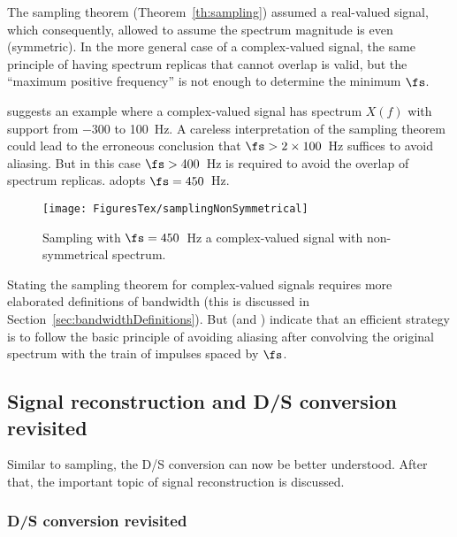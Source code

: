 The sampling theorem (Theorem~\ref{th:sampling}) assumed a real-valued signal, which consequently,
allowed to assume the spectrum magnitude is even (symmetric). In the more general case
of a complex-valued signal, the same principle of having spectrum replicas that cannot overlap
is valid, but the ``maximum positive frequency'' is not enough to determine the minimum $\fs$.

 suggests an example where a complex-valued signal has spectrum
$X(f)$ with support from $-300$ to 100~Hz. A careless interpretation of the sampling theorem
could lead to the erroneous conclusion that $\fs > 2 \times 100$~Hz suffices to avoid aliasing.
But in this case $\fs > 400$~Hz is required to avoid the overlap of spectrum replicas.
 adopts $\fs = 450$~Hz.

\begin{figure}
\centering
\texttt{[image: FiguresTex/samplingNonSymmetrical]}
\caption{Sampling with $\fs=450$~Hz a complex-valued signal with non-symmetrical spectrum.\label{fig:samplingNonSymmetrical}}
\end{figure}

Stating the sampling theorem for complex-valued signals requires more elaborated definitions of bandwidth (this is discussed in Section~\ref{sec:bandwidthDefinitions}). But  (and ) indicate that an efficient strategy is 
to follow the basic principle of avoiding aliasing after convolving the original spectrum
with the train of impulses spaced by $\fs$.


\subsection{Signal reconstruction and D/S conversion revisited}
\label{sec:signal_reconstruction}

Similar to sampling, the D/S conversion can now be better understood.
After that, the important topic of signal reconstruction is discussed.

\subsubsection{D/S conversion revisited}
\label{sec:dcConversionRevisited}

